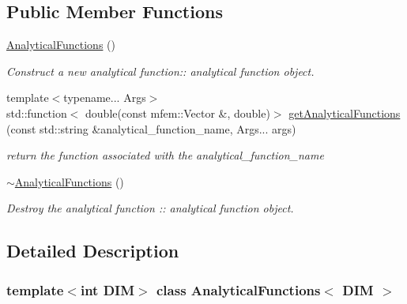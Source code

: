 \subsection*{Public Member Functions}
\begin{DoxyCompactItemize}
\item 
\mbox{\label{classAnalyticalFunctions_a6474690b4e60e8d3e55fc12d46752144}} 
\hyperlink{classAnalyticalFunctions_a6474690b4e60e8d3e55fc12d46752144}{Analytical\+Functions} ()
\begin{DoxyCompactList}\small\item\em Construct a new analytical function\+:\+: analytical function object. \end{DoxyCompactList}\item 
{\footnotesize template$<$typename... Args$>$ }\\std\+::function$<$ double(const mfem\+::\+Vector \&, double)$>$ \hyperlink{classAnalyticalFunctions_a88a27c868b872e12d16f1097779fd3f8}{get\+Analytical\+Functions} (const std\+::string \&analytical\+\_\+function\+\_\+name, Args... args)
\begin{DoxyCompactList}\small\item\em return the function associated with the analytical\+\_\+function\+\_\+name \end{DoxyCompactList}\item 
\mbox{\label{classAnalyticalFunctions_a937c9536543c324e57dfab404846d55b}} 
\hyperlink{classAnalyticalFunctions_a937c9536543c324e57dfab404846d55b}{$\sim$\+Analytical\+Functions} ()
\begin{DoxyCompactList}\small\item\em Destroy the analytical function \+:\+: analytical function object. \end{DoxyCompactList}\end{DoxyCompactItemize}


\subsection{Detailed Description}
\subsubsection*{template$<$int D\+IM$>$\newline
class Analytical\+Functions$<$ D\+I\+M $>$}



